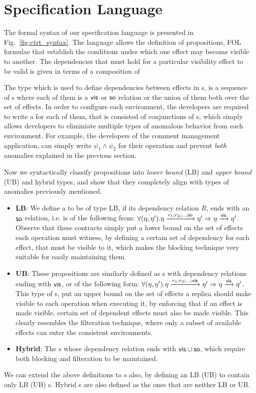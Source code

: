 \section {Specification Language} 
\label{sec:ctrt_language}


The formal syntax of our specification language is presented in
Fig.~\ref{fig:ctrt_syntax}.  The language allows the definition of
propositions, FOL formulae that establish the conditions under which
one effect may become visible to another.  The dependencies that must
hold for a particular visibility effect to be valid is given in
terms of a composition of 

The type \relationS{} which is used to define dependencies between
effects in \propS{}s, is a sequence of \seedS{}s where each of them is
a ${\normalfont \textsf{vis}}$ or ${\normalfont \textsf{so}}$ relation or the union of them both over the set of
effects. In order to configure each environment, the developers are
required to write a \specS{} for each of them, that is consisted of
conjunctions of \propS{}s, which simply allows developers to
eliminiate multiple types of anomalous behavior from each
environment. For example, the developers of the comment management
application, can simply write $\psi_1\wedge \psi_2$ for their \readC{}
operation and prevent \emph{both} anomalies explained in the previous
section.

Now we syntactically  classify propositions into \emph{lower bound} (LB) and
\emph{upper bound} (UB) and hybrid types, and show that they completely
align with types of
anomalies previously mentioned. 
\begin{itemize}
\item {\bf LB}: We define a \propS{} to be of type LB, 
if its dependency relation $R$, ends with an ${\normalfont \textsf{so}}$ relation, i.e. is of
the following from: $\forall(\eta,\eta'). \eta \xrightarrow{r_1;r_2;...;{\normalfont \textsf{so}}} \eta'
\Rightarrow \eta \xrightarrow{{\normalfont \textsf{vis}}} \eta'$.
Observe that these contracts simply put a lower bound on the set of
effects each operation must witness, by defining a certain set of
dependency for each effect, that must be visible to it, which makes the
blocking technique very suitable for easily maintaining them.
\item {\bf UB}:  These propositions are similarly defined as \propS{}s
with dependency relations ending with ${\normalfont \textsf{vis}}$, or of the following form: 
$\forall(\eta,\eta'). \eta \xrightarrow{r_1;r_2;...;{\normalfont \textsf{vis}}} \eta'
\Rightarrow \eta \xrightarrow{{\normalfont \textsf{vis}}} \eta'$.
This type of \propS{}s, put an upper bound on the set of effects 
a replica should make visible to each operation when executing it, by
enforcing that if an effect is made visible, certain set of dependent
effects must also be made visible. This clearly resembles the
filteration technique, where only a subset of available effects can enter
the consistent environments.
\item {\bf Hybrid}: The \propS{}s whose dependency relation ends with
${\normalfont \textsf{vis}}\cup {\normalfont \textsf{so}}$, which require both blocking and filteration to be
maintained. 
\end{itemize}
We can extend the above definitions to \specS{}s also, by defining an LB
(UB) \specS{} to contain only LB (UB) \propS{}s. Hybrid \specS{}s are also
defined as the ones that are neither LB or UB.

